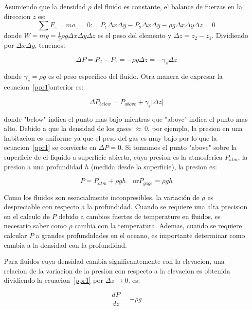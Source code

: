 \documentclass[10pt, oneside]{article}
\begin{document}
Asumiendo que la densidad $\rho$ del fluido es constante, el balance de fuerzas en la direccion $z$ es:
$$
\sum F_z = m a_z = 0: \quad P_1 \Delta x \Delta y - P_2 \Delta x \Delta y - \rho g \Delta x \Delta y \Delta z = 0
$$
donde $W = mg = \frac{1}{2} \rho g \Delta x \Delta y \Delta z$ es el peso del elemento y $\Delta z = z_2 - z_1 $. Dividiendo por $\Delta x \Delta y$, tenemos:

\begin{equation}
\Delta P = P_2 - P_1 = -\rho g \Delta z = -\gamma_s \Delta z
\label{ppr1}
\end{equation}

donde $\gamma_s = \rho g$ es el peso especifico  del fluido. Otra manera de expresar la ecuacion~\ref{ppr1}anterior es:

\begin{equation}
\Delta P_{below} = P_{above} + \gamma_s |\Delta z|
\label{ppr2}
\end{equation}

donde "below" indica el punto mas bajo mientras que "above" indica el punto mas alto. Debido a que la densidad de los gases $\approx\ 0$, por ejemplo, la presion en una habitacion es uniforme ya que el peso del gas es muy bajo por lo que la ecuacion~\ref{ppr1} se convierte en $\Delta P=0$. 
Si tomamos el punto "above" sobre la superficie de el liquido a superficie abierta, cuya presion es la atmosferica $P_{atm}$, la presion a una profundidad $h$ (medida desde la superficie), la presion es:

\begin{equation}
P = P_{atm} + \rho g h \quad \text{or} P_{gage}=\rho g h
\label{ppr3}
\end{equation}

Como los fluidos son esencialmente inconpresibles, la variaci\'on de $\rho$ es despreciable con respecto a la profundidad. Cuando se requiere una alta precision en el calculo de $P$  debido a cambios fuertes de temperature en fluidos, es necesario saber como $\rho$ cambia con la temperatura. Ademas, cuando se requiere calcular  $P$ a grandes profundidades en el oceano, es importante determinar como cambia a la densidad con la profundidad.

Para fluidos cuya densidad cambia significantemente con la elevacion, una relacion de la variacion de la presion con respecto a la elevacion es obtenida dividiendo la ecuacion~\ref{ppr1} por $\Delta z \rightarrow 0$, es:

\begin{equation}
\frac{dP}{dz} = -\rho g
\label{ppr4}
\end{equation}
\end{document}

